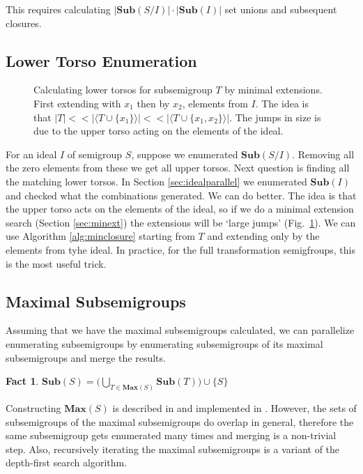 \documentclass{amsart}
\newcommand{\Sub}{\mathbf{Sub}}
\newcommand{\Max}{\mathbf{Max}}
\theoremstyle{plain}
\newtheorem{fact}[theorem]{Fact}
\theoremstyle{definition}
\begin{document}
This requires calculating $|\Sub(S/I)|\cdot|\Sub(I)|$ set unions and subsequent closures. 
\subsection{Lower Torso Enumeration}
\label{sec:lowertorso}
\begin{figure}

\caption{Calculating lower torsos for subsemigroup $T$ by minimal extensions. First extending with $x_1$ then by $x_2$, elements from $I$. The idea is that $|T| << |\langle T\cup\{x_1\}\rangle| << |\langle T\cup\{x_1,x_2\}\rangle|$. The jumps in size is due to the upper torso acting on the elements of the ideal.}
\label{fig:lowertorsoenum}
\end{figure}
For an ideal $I$ of semigroup $S$, suppose we enumerated $\Sub(S/I)$.
Removing all the zero elements from these we get all upper torsos.
Next question is finding all the matching lower torsos.
In Section \ref{sec:idealparallel} we enumerated $\Sub(I)$ and checked what the combinations generated.
We can do better.
The idea is that the upper torso acts on the elements of the ideal, so if we do a minimal extension search (Section \ref{sec:minext}) the extensions will be `large jumps' (Fig.~\ref{fig:lowertorsoenum}).
We can use Algorithm \ref{alg:minclosure} starting from $T$ and extending only by the elements from tyhe ideal. %
In practice, for the full transformation semigfroups, this is the most useful trick.

\subsection{Maximal Subsemigroups}
Assuming that we have the maximal subsemigroups calculated, we can parallelize enumerating subsemigroups by enumerating subsemigroups of its maximal subsemigroups and merge the results.
\begin{fact}
$\Sub(S)=\big( \bigcup_{T\in \Max(S)}\Sub(T)\big)\cup \{S\}$
\end{fact}
\noindent Constructing $\Max(S)$ is described in \cite{MaxSubSemi} and implemented in \cite{Semigroups}.
However, the sets of subsemigroups of the maximal subsemigroups do overlap in general, therefore the same subsemigroup gets enumerated many times and merging is a non-trivial step.
Also, recursively iterating the maximal subsemigroups is a variant of the depth-first search algorithm.  
\end{document}
